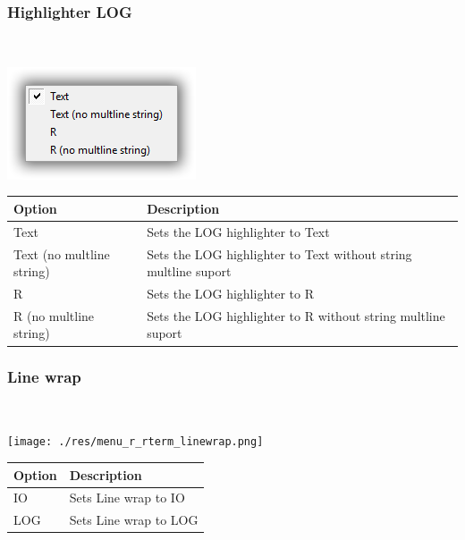 \hypertarget{menu_view_r_rterm_highlighter_Log}{}
\subsubsection{Highlighter LOG}\\

\includegraphics[scale=0.50]{./res/menu_r_rterm_highlighter_log.png}\\

\begin{scriptsize}
  \begin{tabularx}{\textwidth}{>{\hsize=0.3\hsize}X>{\hsize=0.7\hsize}X}\\
    \hline
    \textbf{Option} & \textbf{Description} \\
    \hline
    Text & Sets the LOG highlighter to Text \\
    Text (no multline string) & Sets the LOG highlighter to Text without string multline suport \\
    R & Sets the LOG highlighter to R \\
    R (no multline string) & Sets the LOG highlighter to R without string multline suport \\
    \hline
  \end{tabularx}
\end{scriptsize}


\hypertarget{menu_view_r_rterm_linewrap}{}
\subsubsection{Line wrap}\\

\texttt{[image: ./res/menu\_r\_rterm\_linewrap.png]}\\

\begin{scriptsize}
  \begin{tabularx}{\textwidth}{>{\hsize=0.3\hsize}X>{\hsize=0.7\hsize}X}\\
    \hline
    \textbf{Option} & \textbf{Description} \\
    \hline
    IO & Sets Line wrap to IO \\
    LOG & Sets Line wrap to LOG \\
    \hline
  \end{tabularx}
\end{scriptsize}


